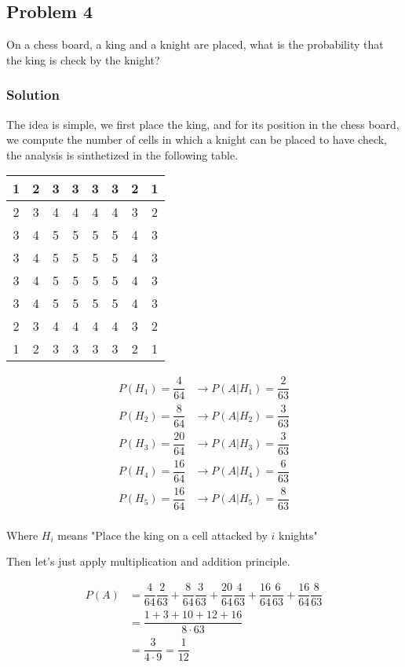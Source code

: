 \documentclass{article}
\begin{document}
\subsection*{Problem 4}

On a chess board, a king and a knight are placed, what is the probability that the king is check by the knight?

\subsubsection*{Solution}

The idea is simple, we first place the king, and for its position in the chess board, we compute the number of cells in which a knight can be placed to have check, the analysis is sinthetized in the following table.

\begin{center}
    \begin{tabular}{|c|c|c|c|c|c|c|c|}
        \hline
        1 & 2 & 3 & 3 & 3 & 3 & 2 & 1 \\ \hline
        2 & 3 & 4 & 4 & 4 & 4 & 3 & 2 \\ \hline
        3 & 4 & 5 & 5 & 5 & 5 & 4 & 3 \\ \hline
        3 & 4 & 5 & 5 & 5 & 5 & 4 & 3 \\ \hline
        3 & 4 & 5 & 5 & 5 & 5 & 4 & 3 \\ \hline
        3 & 4 & 5 & 5 & 5 & 5 & 4 & 3 \\ \hline
        2 & 3 & 4 & 4 & 4 & 4 & 3 & 2 \\ \hline
        1 & 2 & 3 & 3 & 3 & 3 & 2 & 1 \\ \hline
    \end{tabular}
\end{center}

\begin{align*}
    P(H_1) = \dfrac{4}{64} & \rightarrow P(A | H_1) = \dfrac{2}{63} \\
    P(H_2) = \dfrac{8}{64} & \rightarrow P(A | H_2) = \dfrac{3}{63} \\
    P(H_3) = \dfrac{20}{64} & \rightarrow P(A | H_3) = \dfrac{3}{63} \\
    P(H_4) = \dfrac{16}{64} & \rightarrow P(A | H_4) = \dfrac{6}{63} \\
    P(H_5) = \dfrac{16}{64} & \rightarrow P(A | H_5) = \dfrac{8}{63} \\
\end{align*}

Where $H_i$ means "Place the king on a cell attacked by $i$ knights"

Then let's just apply multiplication and addition principle.

\begin{align*}
    P(A) &= \dfrac{4}{64}\dfrac{2}{63} + \dfrac{8}{64}\dfrac{3}{63} + \dfrac{20}{64}\dfrac{4}{63} + \dfrac{16}{64}\dfrac{6}{63} + \dfrac{16}{64}\dfrac{8}{63} \\
    &= \dfrac{1 + 3 + 10 + 12 + 16}{8 \cdot 63} \\
    &= \dfrac{3}{4 \cdot 9} = \dfrac{1}{12}
\end{align*}
\end{document}
